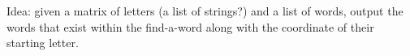 

Idea: given a matrix of letters (a list of strings?) and a list of words, output the words
that exist within the find-a-word along with the coordinate of their starting letter.


